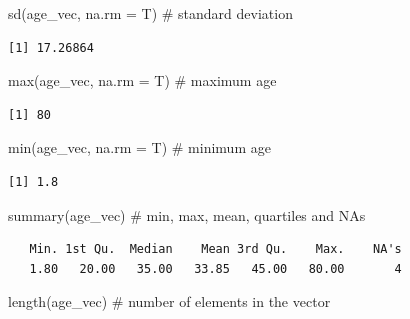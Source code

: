 \documentclass[
  letterpaper,
  DIV=11,
  numbers=noendperiod]{scrreprt}
\newenvironment{Shaded}{\begin{snugshade}}{\end{snugshade}}
\newcommand{\AttributeTok}[1]{\textcolor[rgb]{0.40,0.45,0.13}{#1}}
\newcommand{\CommentTok}[1]{\textcolor[rgb]{0.37,0.37,0.37}{#1}}
\newcommand{\FunctionTok}[1]{\textcolor[rgb]{0.28,0.35,0.67}{#1}}
\newcommand{\NormalTok}[1]{\textcolor[rgb]{0.00,0.23,0.31}{#1}}
\begin{document}
\begin{Shaded}
\begin{Highlighting}[]
\FunctionTok{sd}\NormalTok{(age\_vec, }\AttributeTok{na.rm =}\NormalTok{ T) }\CommentTok{\# standard deviation}
\end{Highlighting}
\end{Shaded}

\begin{verbatim}
[1] 17.26864
\end{verbatim}

\begin{Shaded}
\begin{Highlighting}[]
\FunctionTok{max}\NormalTok{(age\_vec, }\AttributeTok{na.rm =}\NormalTok{ T) }\CommentTok{\# maximum age}
\end{Highlighting}
\end{Shaded}

\begin{verbatim}
[1] 80
\end{verbatim}

\begin{Shaded}
\begin{Highlighting}[]
\FunctionTok{min}\NormalTok{(age\_vec, }\AttributeTok{na.rm =}\NormalTok{ T) }\CommentTok{\# minimum age}
\end{Highlighting}
\end{Shaded}

\begin{verbatim}
[1] 1.8
\end{verbatim}

\begin{Shaded}
\begin{Highlighting}[]
\FunctionTok{summary}\NormalTok{(age\_vec) }\CommentTok{\# min, max, mean, quartiles and NAs}
\end{Highlighting}
\end{Shaded}

\begin{verbatim}
   Min. 1st Qu.  Median    Mean 3rd Qu.    Max.    NA's 
   1.80   20.00   35.00   33.85   45.00   80.00       4 
\end{verbatim}

\begin{Shaded}
\begin{Highlighting}[]
\FunctionTok{length}\NormalTok{(age\_vec) }\CommentTok{\# number of elements in the vector}
\end{Highlighting}
\end{Shaded}
\end{document}

